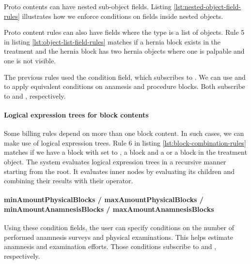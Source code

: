Proto contents can have nested sub-object fields.
Listing \ref{lst:nested-object-field-rules} illustrates how we enforce conditions on fields inside nested objects.


Proto content rules can also have fields where the type is a list of objects.
Rule 5 in listing \ref{lst:object-list-field-rules} matches if a hernia block exists in the treatment and the hernia block has two hernia objects where one is palpable and one is not visible.


The previous rules used the  condition field, which subscribes to .
We can use  and  to apply equivalent conditions on anamesis and procedure blocks.
Both subscribe to  and , respectively.

\paragraph{Logical expression trees for block contents}\label{par:logical-trees}
Some billing rules depend on more than one block content.
In such cases, we can make use of logical expression trees.
Rule 6 in listing \ref{lst:block-combination-rules} matches if we have a  block with  set to \true,
a  block and a  or a  block in the treatment object.
The system evaluates logical expression trees in a recursive manner starting from the root.
It evaluates inner nodes by evaluating its children and combining their results with their operator.


\paragraph{minAmountPhysicalBlocks / maxAmountPhysicalBlocks / minAmountAnamnesisBlocks / maxAmountAnamnesisBlocks}
Using these condition fields, the user can specify conditions on the number of performed anamnesis surveys and physical examinations.
This helps estimate anamnesis and examination efforts.
Those conditions subscribe to  and , respectively.

